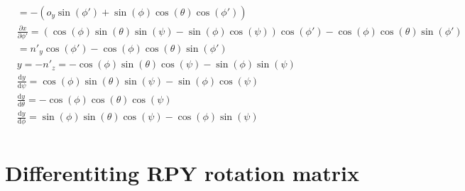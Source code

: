 \documentclass[a4paper,10pt]{article}
\begin{document}
\begin{eqnarray}
	&= -\left(o_y \sin\left(\phi'\right) + \sin\left(\phi\right)\cos\left(\theta\right)\cos\left(\phi'\right) \right) \\
	& \frac{\partial x}{\partial \phi'} = \left(\cos \left(\phi\right) \sin \left(\theta\right) \sin \left(\psi\right) -\sin \left(\phi\right) \cos \left(\psi\right) \right)\cos\left(\phi' \right) - \cos\left(\phi\right) \cos\left(\theta\right) \sin\left(\phi'\right) \nonumber \\
	&= n'_y \cos\left(\phi'\right) - \cos\left(\phi\right) \cos\left(\theta\right) \sin\left(\phi'\right)\\
	&y = -n'_z = -\cos \left(\phi\right) \sin \left(\theta\right) \cos \left(\psi\right) - \sin \left(\phi\right) \sin \left(\psi\right)\\
	&\frac{\mathrm{d} y}{\mathrm{d} \psi} = \cos \left(\phi\right) \sin \left(\theta\right) \sin \left(\psi\right) - \sin \left(\phi\right) \cos \left(\psi\right)\\
	&\frac{\mathrm{d} y}{\mathrm{d} \theta} = -\cos \left(\phi\right) \cos \left(\theta\right) \cos \left(\psi\right)\\
	&\frac{\mathrm{d} y}{\mathrm{d} \phi} = \sin \left(\phi\right) \sin \left(\theta\right) \cos \left(\psi\right) - \cos \left(\phi\right) \sin \left(\psi\right)\\
\end{eqnarray}

\section{Differentiting RPY rotation matrix}
\end{document}

